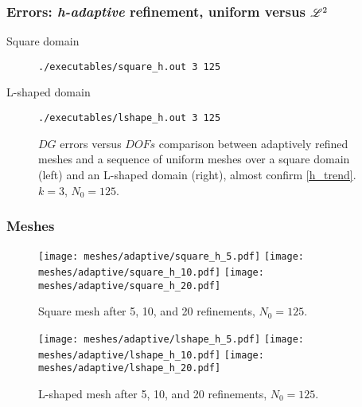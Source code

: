\begin{frame}[fragile]
    \frametitle{Errors: \textit{h-adaptive} refinement, uniform versus $\mathscr{L}^2$}

    \begin{description}
        \item[Square domain] \lstinline{./executables/square_h.out 3 125}
        \item[L-shaped domain] \lstinline{./executables/lshape_h.out 3 125}
    \end{description}

    \begin{figure}[!ht]
        
        \caption{$DG$ errors versus $DOFs$ comparison between adaptively refined meshes and a sequence of uniform meshes over a square domain (left) and an L-shaped domain (right), almost confirm \eqref{h_trend}. $k = 3$, $N_0 = 125$.}
    \end{figure}
\end{frame}

\begin{frame}
    \frametitle{Meshes}

    \begin{figure}[!ht]
        \centering
        \texttt{[image: meshes/adaptive/square\_h\_5.pdf]}
        \texttt{[image: meshes/adaptive/square\_h\_10.pdf]}
        \texttt{[image: meshes/adaptive/square\_h\_20.pdf]}
        \caption{Square mesh after 5, 10, and 20 refinements, $N_0 = 125$.}
    \end{figure}
    
    \begin{figure}[!ht]
        \centering
        \texttt{[image: meshes/adaptive/lshape\_h\_5.pdf]}
        \texttt{[image: meshes/adaptive/lshape\_h\_10.pdf]}
        \texttt{[image: meshes/adaptive/lshape\_h\_20.pdf]}
        \caption{L-shaped mesh after 5, 10, and 20 refinements, $N_0 = 125$.}
    \end{figure}
\end{frame}


